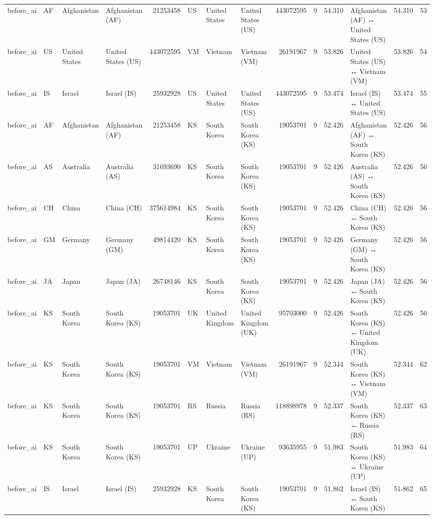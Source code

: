 \begin{tabular}{llllrlllrrrlrr}
before\_ai & AF & Afghanistan & Afghanistan (AF) & 21253458 & US & United States & United States (US) & 443072595 & 9 & 54.310 & Afghanistan (AF) ↔ United States (US) & 54.310 & 53 \\
before\_ai & US & United States & United States (US) & 443072595 & VM & Vietnam & Vietnam (VM) & 26191967 & 9 & 53.826 & United States (US) ↔ Vietnam (VM) & 53.826 & 54 \\
before\_ai & IS & Israel & Israel (IS) & 25932928 & US & United States & United States (US) & 443072595 & 9 & 53.474 & Israel (IS) ↔ United States (US) & 53.474 & 55 \\
before\_ai & AF & Afghanistan & Afghanistan (AF) & 21253458 & KS & South Korea & South Korea (KS) & 19053701 & 9 & 52.426 & Afghanistan (AF) ↔ South Korea (KS) & 52.426 & 56 \\
before\_ai & AS & Australia & Australia (AS) & 31693690 & KS & South Korea & South Korea (KS) & 19053701 & 9 & 52.426 & Australia (AS) ↔ South Korea (KS) & 52.426 & 56 \\
before\_ai & CH & China & China (CH) & 375614984 & KS & South Korea & South Korea (KS) & 19053701 & 9 & 52.426 & China (CH) ↔ South Korea (KS) & 52.426 & 56 \\
before\_ai & GM & Germany & Germany (GM) & 49814420 & KS & South Korea & South Korea (KS) & 19053701 & 9 & 52.426 & Germany (GM) ↔ South Korea (KS) & 52.426 & 56 \\
before\_ai & JA & Japan & Japan (JA) & 26748146 & KS & South Korea & South Korea (KS) & 19053701 & 9 & 52.426 & Japan (JA) ↔ South Korea (KS) & 52.426 & 56 \\
before\_ai & KS & South Korea & South Korea (KS) & 19053701 & UK & United Kingdom & United Kingdom (UK) & 95703000 & 9 & 52.426 & South Korea (KS) ↔ United Kingdom (UK) & 52.426 & 56 \\
before\_ai & KS & South Korea & South Korea (KS) & 19053701 & VM & Vietnam & Vietnam (VM) & 26191967 & 9 & 52.344 & South Korea (KS) ↔ Vietnam (VM) & 52.344 & 62 \\
before\_ai & KS & South Korea & South Korea (KS) & 19053701 & RS & Russia & Russia (RS) & 118898978 & 9 & 52.337 & South Korea (KS) ↔ Russia (RS) & 52.337 & 63 \\
before\_ai & KS & South Korea & South Korea (KS) & 19053701 & UP & Ukraine & Ukraine (UP) & 93635955 & 9 & 51.983 & South Korea (KS) ↔ Ukraine (UP) & 51.983 & 64 \\
before\_ai & IS & Israel & Israel (IS) & 25932928 & KS & South Korea & South Korea (KS) & 19053701 & 9 & 51.862 & Israel (IS) ↔ South Korea (KS) & 51.862 & 65 \\

\end{tabular}
